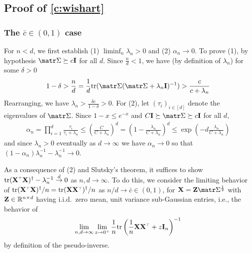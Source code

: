 \documentclass[../../thesis.tex]{subfiles}
\begin{document}
\subsection{Proof of \cref{c:wishart}}
\label{sec:proof-of-c-wishart}

\subsubsection{The $\bar c \in (0,1)$ case}

For $n < d$, we first establish (1) $\liminf_n \lambda_n > 0$ and (2) $\alpha_n \to 0$.
To prove (1), by hypothesis $\Sigmab \succeq c \I$ for all $d$. Since $\frac{n}{d} < 1$,
we have (by definition of $\lambda_n$) for some $\delta > 0$
\begin{align*}
  1 - \delta
  > \frac{n}{d}
  = \frac{1}{d} \tr(\Sigmab(\Sigmab + \lambda_n \I)^{-1})
  > \frac{c}{c + \lambda_n}
\end{align*}
Rearranging, we have $\lambda_n > \frac{\delta c}{1 - \delta} > 0$.
For (2), let $(\tau_i)_{i \in [d]}$ denote the eigenvalues of $\Sigmab$.
Since $1 - x \leq e^{-x}$ and $C \I \succeq \Sigmab \succeq c \I$ for all $d$,
\begin{align*}
  \alpha_n
  = \prod_{i=1}^d \frac{\tau_i}{\tau_i + \lambda_n}
  \leq \left(\frac{C}{C + \lambda_n}\right)^d
  = \left( 1 - \frac{\lambda_n}{C + \lambda_n}\right)^d
  \leq \exp\left(-d \frac{\lambda_n}{C + \lambda_n}\right)
\end{align*}
and since $\lambda_n > 0$ eventually as $d \to \infty$ we have
$\alpha_n \to 0$ so that $(1-\alpha_n) \lambda_n^{-1} - \lambda_n^{-1} \to 0$.

As a consequence of (2) and Slutsky's theorem, it suffices to show
$\tr(\X^\top \X)^\dag - \lambda_n^{-1} \overset{d}{\to} 0$ as $n,d \to \infty$.
To do this, we consider the limiting behavior of $\tr
  (\X^\top \X)^\dagger/n = \tr (\X \X^\top)^\dagger/n$ as $n/d \to \bar c \in
  (0,1)$, for $\X = \Z \Sigmab^{\frac12}$ with $\mathbf Z \in \mathbb R^{n \times d}$
having i.i.d.~zero mean, unit variance sub-Gaussian entries, i.e., the behavior
of
\begin{equation}\label{eq:limit1}
  \lim_{n,d \to \infty} \lim_{z \to 0^+} \frac1n \tr \left( \frac1n \X \X^\top + z \I_n \right)^{-1}
\end{equation}
by definition of the pseudo-inverse.
\end{document}
